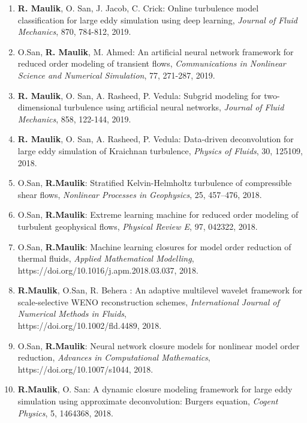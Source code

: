 \documentclass[letterpaper]{article}
\begin{document}
\begin{enumerate}
\item \textbf{R. Maulik}, O. San, J. Jacob, C. Crick: Online turbulence model classification for large eddy simulation using deep learning, {\it Journal of Fluid Mechanics}, 870, 784-812, 2019.

\item O.San, \textbf{R. Maulik}, M. Ahmed: An artificial neural network framework for reduced order modeling of transient flows, {\it Communications in Nonlinear Science and Numerical Simulation}, 77, 271-287, 2019.

\item \textbf{R. Maulik}, O. San, A. Rasheed, P. Vedula: Subgrid modeling for two-dimensional turbulence using artificial neural networks, {\it Journal of Fluid Mechanics}, 858, 122-144, 2019.

\item \textbf{R. Maulik}, O. San, A. Rasheed, P. Vedula: Data-driven deconvolution for large eddy simulation of Kraichnan turbulence, {\it Physics of Fluids}, 30, 125109, 2018.

\item O.San, \textbf{R.Maulik}: Stratified Kelvin-Helmholtz turbulence of compressible shear flows, {\it Nonlinear Processes in Geophysics}, 25, 457--476, 2018.
 
\item O.San, \textbf{R.Maulik}: Extreme learning machine for reduced order modeling of turbulent geophysical flows, {\it Physical Review E}, 97, 042322, 2018.

\item O.San, \textbf{R.Maulik}: Machine learning closures for model order reduction of thermal fluids,  {\it Applied Mathematical Modelling}, https://doi.org/10.1016/j.apm.2018.03.037, 2018.

\item \textbf{R.Maulik}, O.San, R. Behera : An adaptive multilevel wavelet framework for scale-selective WENO reconstruction schemes, {\it International Journal of Numerical Methods in Fluids},\\ https://doi.org/10.1002/fld.4489, 2018.

\item O.San, \textbf{R.Maulik}: Neural network closure models for nonlinear model order reduction, {\it Advances in Computational Mathematics}, https://doi.org/10.1007/s1044, 2018.

\item \textbf{R.Maulik}, O. San: A dynamic closure modeling framework for large eddy simulation using approximate deconvolution: Burgers equation, {\it Cogent Physics}, 5, 1464368, 2018.


\end{enumerate}
\end{document}
